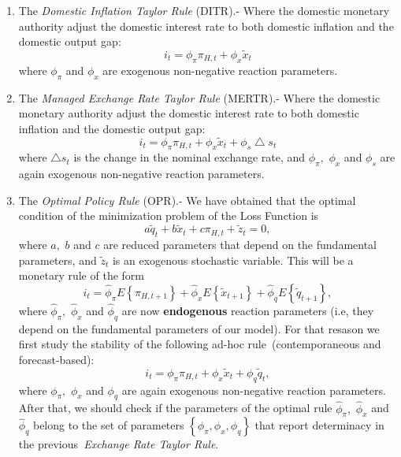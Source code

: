 \documentclass{article}
\begin{document}
\begin{enumerate}
\item The \textit{Domestic Inflation Taylor Rule} (DITR).- Where the
domestic monetary authority adjust the domestic interest rate to both
domestic inflation and the domestic output gap:%
\begin{equation}
i_{t}=\phi _{\pi }\pi _{H,t}+\phi _{x}\widetilde{x}_{t}  \label{DITR}
\end{equation}%
where $\phi _{\pi }$ and $\phi _{x}$ are exogenous non-negative reaction
parameters.

\item The \textit{Managed Exchange Rate Taylor Rule} (MERTR).- Where the
domestic monetary authority adjust the domestic interest rate to both
domestic inflation and the domestic output gap:%
\begin{equation}
i_{t}=\phi _{\pi }\pi _{H,t}+\phi _{x}\widetilde{x}_{t}+\phi
_{s}\bigtriangleup s_{t}  \label{MERTR}
\end{equation}%
where $\bigtriangleup s_{t}$ is the change in the nominal exchange rate, and 
$\phi _{\pi },$ $\phi _{x}$ and $\phi _{s}$ are again exogenous non-negative
reaction parameters.

\item The \textit{Optimal Policy Rule} (OPR).- We have obtained that the
optimal condition of the minimization problem of the Loss Function is%
\begin{equation}
a\widetilde{q}_{t}+b\widetilde{x}_{t}+c\pi _{H,t}+\widetilde{z}_{t}=0,
\label{OPR}
\end{equation}%
where $a,$ $b$ and $c$ are reduced parameters that depend on the fundamental
parameters, and $\widetilde{z}_{t}$ is an exogenous stochastic variable.
This will be a monetary rule of the form%
\begin{equation*}
i_{t}=\widehat{\phi }_{\pi }E\left\{ \pi _{H,t+1}\right\} +\widehat{\phi }%
_{x}E\left\{ \widetilde{x}_{t+1}\right\} +\widehat{\phi }_{q}E\left\{ 
\widetilde{q}_{t+1}\right\} ,
\end{equation*}%
where $\widehat{\phi }_{\pi },$ $\widehat{\phi }_{x}$ and $\widehat{\phi }%
_{q}$ are now \textbf{endogenous} reaction parameters (i.e, they depend on
the fundamental parameters of our model). For that resason we first study
the stability of the following ad-hoc rule\ (contemporaneous and
forecast-based):%
\begin{equation}
i_{t}=\phi _{\pi }\pi _{H,t}+\phi _{x}\widetilde{x}_{t}+\phi _{q}\widetilde{q%
}_{t},  \label{ERTR}
\end{equation}%
where $\phi _{\pi },$ $\phi _{x}$ and $\phi _{q}$ are again exogenous
non-negative reaction parameters. After that, we should check if the
parameters of the optimal rule $\widehat{\phi }_{\pi },$ $\widehat{\phi }%
_{x} $ and $\widehat{\phi }_{q}$ belong to the set of parameters $\left\{
\phi _{\pi },\phi _{x},\phi _{q}\right\} $ that report determinacy in the
previous\textit{\ Exchange Rate Taylor Rule}.
\end{enumerate}
\end{document}
